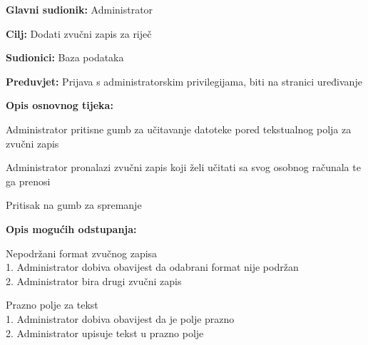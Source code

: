 					\noindent {}
					\begin{packed_item}
						\item \textbf{Glavni sudionik:} Administrator
						\item \textbf{Cilj:} Dodati zvučni zapis za riječ
						\item \textbf{Sudionici:} Baza podataka
						\item \textbf{Preduvjet:} Prijava s administratorskim privilegijama, biti na stranici uređivanje
						\item \textbf{Opis osnovnog tijeka:}
						\begin{packed_enum}
							\item Administrator pritisne gumb za učitavanje datoteke pored tekstualnog polja za zvučni zapis
							\item Administrator pronalazi zvučni zapis koji želi učitati sa svog osobnog računala te ga prenosi
							\item Pritisak na gumb za spremanje
						\end{packed_enum}
						\item \textbf{Opis mogućih odstupanja:}
						\begin{packed_item}
							\item [2.a] Nepodržani format zvučnog zapisa
							\\1. Administrator dobiva obavijest da odabrani format nije podržan
							\\2. Administrator bira drugi zvučni zapis
							\item [3.a] Prazno polje za tekst
							\\1. Administrator dobiva obavijest da je polje prazno
							\\2. Administrator upisuje tekst u prazno polje
						\end{packed_item}
					\end{packed_item}
					

